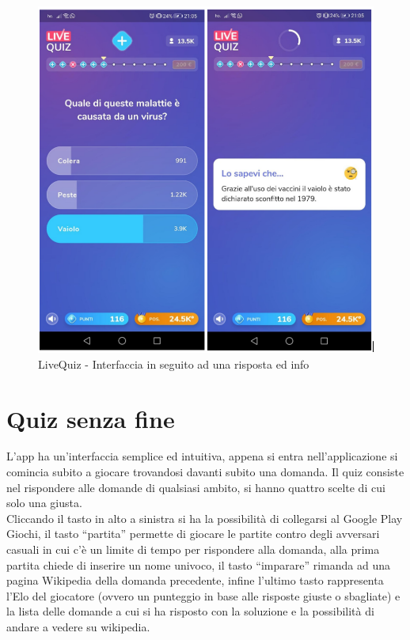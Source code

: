 \documentclass{article}
\begin{document}
\begin{figure}[htp]
\begin{center}
\includegraphics[width=1 \textwidth]{Figure7.png}
\caption{LiveQuiz - Interfaccia in seguito ad una risposta ed info}
\end{center}
\end{figure}


\newpage

\section{Quiz senza fine}
L’app ha un’interfaccia semplice ed intuitiva, appena si entra nell’applicazione si comincia subito a giocare trovandosi davanti subito una domanda. Il quiz consiste nel rispondere alle domande di qualsiasi ambito, si hanno quattro scelte di cui solo una giusta.
\\\indent
Cliccando il tasto in alto a sinistra si ha la possibilità di collegarsi al Google Play Giochi, il tasto “partita” permette di giocare le partite contro degli avversari casuali in cui c’è un limite di tempo per rispondere alla domanda, alla prima partita chiede di inserire un nome univoco, il tasto “imparare” rimanda ad una pagina Wikipedia della domanda precedente,  infine l’ultimo tasto rappresenta l’Elo del giocatore (ovvero un punteggio in base alle risposte giuste o sbagliate) e la lista delle domande a cui si ha risposto con la soluzione e la possibilità di andare a vedere su wikipedia.
\end{document}
